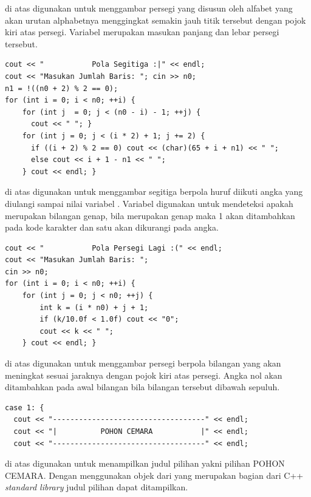 \documentclass[../main.tex]{subfiles}
\begin{document}
{\Script} di atas digunakan untuk menggambar persegi yang disusun oleh alfabet yang akan urutan alphabetnya menggingkat semakin jauh titik tersebut dengan pojok kiri atas persegi. Variabel  merupakan masukan panjang dan lebar persegi tersebut.

\begin{code}
\begin{verbatim}
cout << "           Pola Segitiga :|" << endl;
cout << "Masukan Jumlah Baris: "; cin >> n0;
n1 = !((n0 + 2) % 2 == 0);
for (int i = 0; i < n0; ++i) {
	for (int j  = 0; j < (n0 - i) - 1; ++j) {
	  cout << " "; }
	for (int j = 0; j < (i * 2) + 1; j += 2) {
	  if ((i + 2) % 2 == 0) cout << (char)(65 + i + n1) << " ";
	  else cout << i + 1 - n1 << " ";
	} cout << endl; }
\end{verbatim}
\end{code}

{\Script} di atas digunakan untuk menggambar segitiga berpola huruf diikuti angka yang diulangi sampai nilai variabel . Variabel  digunakan untuk mendeteksi apakah  merupakan bilangan genap, bila  merupakan genap maka 1 akan ditambahkan pada kode karakter dan satu akan dikurangi pada angka.

\begin{code}
\begin{verbatim}
cout << "           Pola Persegi Lagi :(" << endl;
cout << "Masukan Jumlah Baris: ";
cin >> n0;
for (int i = 0; i < n0; ++i) {
	for (int j = 0; j < n0; ++j) {
		int k = (i * n0) + j + 1;
		if (k/10.0f < 1.0f) cout << "0";
		cout << k << " ";
	} cout << endl; }
\end{verbatim}
\end{code}

{\Script} di atas digunakan untuk menggambar persegi berpola bilangan yang akan meningkat sesuai jaraknya dengan pojok kiri atas persegi. Angka nol akan ditambahkan pada awal bilangan bila bilangan tersebut dibawah sepuluh.

\begin{code}
\begin{verbatim}
case 1: {
  cout << "-----------------------------------" << endl;
  cout << "|          POHON CEMARA           |" << endl;
  cout << "-----------------------------------" << endl;
\end{verbatim}
\end{code}

{\Script} di atas digunakan untuk menampilkan judul pilihan yakni pilihan POHON CEMARA. Dengan menggunakan objek  dari {\header} {\file}  yang merupakan bagian dari C++ \textit{standard library} judul pilihan dapat ditampilkan.
\end{document}
